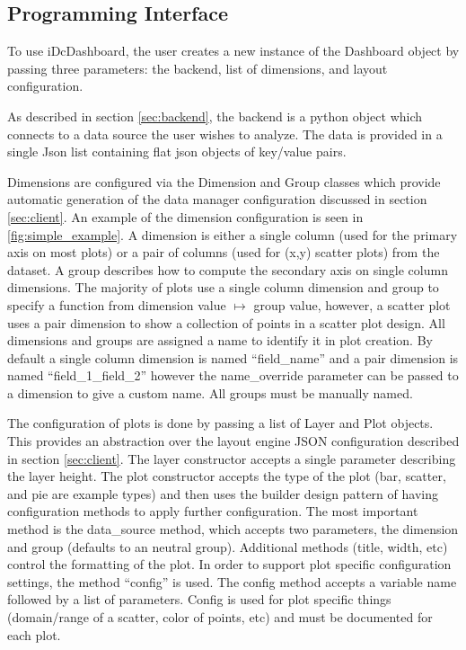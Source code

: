 \documentclass[letter,twocolumn]{article}
\begin{document}
\subsection{Programming Interface}\label{sec:api}

To use iDcDashboard, the user creates a new instance of the Dashboard object by passing three parameters: the backend, list of dimensions, and layout configuration.

As described in section \ref{sec:backend}, the backend is a python object which connects to a data source the user wishes to analyze.
The data is provided in a single Json list containing flat json objects of key/value pairs.

Dimensions are configured via the Dimension and Group classes which provide automatic generation of the data manager configuration discussed in section \ref{sec:client}.
An example of the dimension configuration is seen in \ref{fig:simple_example}.
A dimension is either a single column (used for the primary axis on most plots) or a pair of columns (used for (x,y) scatter plots) from the dataset.
A group describes how to compute the secondary axis on single column dimensions.
The majority of plots use a single column dimension and group to specify a function from dimension value $\mapsto$ group value,
however, a scatter plot uses a pair dimension to show a collection of points in a scatter plot design.
All dimensions and groups are assigned a name to identify it in plot creation.
By default a single column dimension is named ``field\_name''  and a pair dimension is named ``field\_1\_field\_2'' however the name\_override parameter can be passed to a dimension to give a custom name.
All groups must be manually named.

The configuration of plots is done by passing a list of Layer and Plot objects. 
This provides an abstraction over the layout engine JSON configuration described in section \ref{sec:client}.
The layer constructor accepts a single parameter describing the layer height.
The plot constructor accepts the type of the plot (bar, scatter, and pie are example types) and then uses the builder design pattern of having configuration methods to apply further configuration.
The most important method is the data\_source method, which accepts two parameters, the dimension and group (defaults to an neutral group).
Additional methods (title, width, etc) control the formatting of the plot.
In order to support plot specific configuration settings, the method ``config'' is used.
The config method accepts a variable name followed by a list of parameters.
Config is used for plot specific things (domain/range of a scatter, color of points, etc) and must be documented for each plot.
\end{document}
